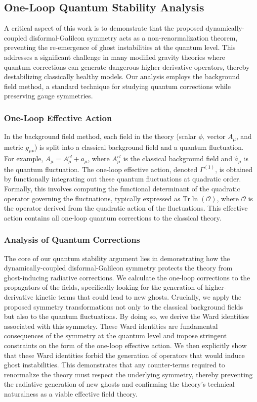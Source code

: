 \documentclass[twocolumn]{aastex631}
\begin{document}
\begin{itemize}
\subsection{One-Loop Quantum Stability Analysis}

A critical aspect of this work is to demonstrate that the proposed dynamically-coupled disformal-Galileon symmetry acts as a non-renormalization theorem, preventing the re-emergence of ghost instabilities at the quantum level. This addresses a significant challenge in many modified gravity theories where quantum corrections can generate dangerous higher-derivative operators, thereby destabilizing classically healthy models. Our analysis employs the background field method, a standard technique for studying quantum corrections while preserving gauge symmetries.

\subsubsection{One-Loop Effective Action}
In the background field method, each field in the theory (scalar $\phi$, vector $A_\mu$, and metric $g_{\mu\nu}$) is split into a classical background field and a quantum fluctuation. For example, $A_\mu = A_\mu^{cl} + \hat{a}_\mu$, where $A_\mu^{cl}$ is the classical background field and $\hat{a}_\mu$ is the quantum fluctuation. The one-loop effective action, denoted $\Gamma^{(1)}$, is obtained by functionally integrating out these quantum fluctuations at quadratic order. Formally, this involves computing the functional determinant of the quadratic operator governing the fluctuations, typically expressed as $\text{Tr} \ln(\mathcal{O})$, where $\mathcal{O}$ is the operator derived from the quadratic action of the fluctuations. This effective action contains all one-loop quantum corrections to the classical theory.

\subsubsection{Analysis of Quantum Corrections}
The core of our quantum stability argument lies in demonstrating how the dynamically-coupled disformal-Galileon symmetry protects the theory from ghost-inducing radiative corrections. We calculate the one-loop corrections to the propagators of the fields, specifically looking for the generation of higher-derivative kinetic terms that could lead to new ghosts. Crucially, we apply the proposed symmetry transformations not only to the classical background fields but also to the quantum fluctuations. By doing so, we derive the Ward identities associated with this symmetry. These Ward identities are fundamental consequences of the symmetry at the quantum level and impose stringent constraints on the form of the one-loop effective action. We then explicitly show that these Ward identities forbid the generation of operators that would induce ghost instabilities. This demonstrates that any counter-terms required to renormalize the theory must respect the underlying symmetry, thereby preventing the radiative generation of new ghosts and confirming the theory's technical naturalness as a viable effective field theory.


\end{itemize}
\end{document}
